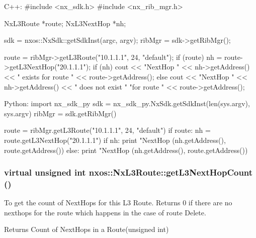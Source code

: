 \begin{DoxyCode}
  C++:
       #include <nx_sdk.h>
       #include <nx_rib_mgr.h>

       NxL3Route    *route;
       NxL3NextHop  *nh;

       sdk = nxos::NxSdk::getSdkInst(argc, argv);
       ribMgr = sdk->getRibMgr();

       route = ribMgr->getL3Route("10.1.1.1", 24, "default");
       if (route) {
           nh = route->getL3NextHop("20.1.1.1");
           if (nh) {
               cout << "NextHop " << nh->getAddress() << " exists for route " 
                    << route->getAddress();
           } else {
               cout << "NextHop " << nh->getAddress() << " does not exist "
                    "for route " << route->getAddress();
           }
       }

  Python:
       import nx_sdk_py
       sdk = nx_sdk_py.NxSdk.getSdkInst(len(sys.argv), sys.argv)
       ribMgr = sdk.getRibMgr()

       route = ribMgr.getL3Route("10.1.1.1", 24, "default")
       if route:
          nh = route.getL3NextHop("20.1.1.1")
          if nh:
             print "NextHop %
                   (nh.getAddress(), route.getAddress())
          else:
             print "NextHop %
                   (nh.getAddress(), route.getAddress())
\end{DoxyCode}
 \hypertarget{classnxos_1_1NxL3Route_a5e402096d7ff280b6f4d334b3bd954d4}{
\subsubsection[{getL3NextHopCount}]{\setlength{\rightskip}{0pt plus 5cm}virtual unsigned int nxos::NxL3Route::getL3NextHopCount ()}}
\label{classnxos_1_1NxL3Route_a5e402096d7ff280b6f4d334b3bd954d4}
To get the count of NextHops for this L3 Route. Returns 0 if there are no nexthops for the route which happens in the case of route Delete.

\begin{DoxyReturn}{Returns}
Count of NextHops in a Route(unsigned int)
\end{DoxyReturn}

